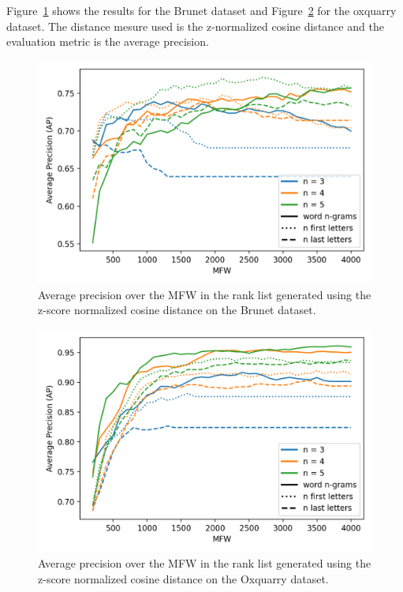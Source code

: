 Figure~\ref{fig:first_last_letters_ngrams_brunet} shows the results for the Brunet dataset and Figure~\ref{fig:first_last_letters_ngrams_oxquarry} for the oxquarry dataset.
The distance mesure used is the z-normalized cosine distance and the evaluation metric is the average precision.

\begin{figure}
  \includegraphics[width=\linewidth]{img/first_last_letters_ngrams_brunet.png}
  \caption{Average precision over the MFW in the rank list generated using the z-score normalized cosine distance on the Brunet dataset.}
  \label{fig:first_last_letters_ngrams_brunet}
\end{figure}
\begin{figure}
  \includegraphics[width=\linewidth]{img/first_last_letters_ngrams_oxquarry.png}
  \caption{Average precision over the MFW in the rank list generated using the z-score normalized cosine distance on the Oxquarry dataset.}
  \label{fig:first_last_letters_ngrams_oxquarry}
\end{figure}

